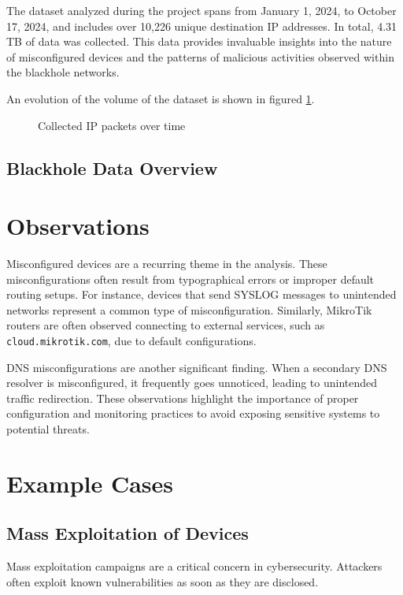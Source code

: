 The dataset analyzed during the project spans from January 1, 2024, to October 17, 2024, and includes over 10,226 unique destination IP addresses. In total, 4.31 TB of data was collected. This data provides invaluable insights into the nature of misconfigured devices and the patterns of malicious activities observed within the blackhole networks.

An evolution of the volume of the dataset is shown in figured \ref{countedpacket}. 

\begin{figure}
    
    \caption{Collected IP packets over time}
    \label{countedpacket}
\end{figure}

{\color{red} \section{Blackhole Data Overview}}

\chapter{Observations} 
Misconfigured devices are a recurring theme in the analysis. These misconfigurations often result from typographical errors or improper default routing setups. For instance, devices that send SYSLOG messages to unintended networks represent a common type of misconfiguration. Similarly, MikroTik routers are often observed connecting to external services, such as \texttt{cloud.mikrotik.com}, due to default configurations.

DNS misconfigurations are another significant finding. When a secondary DNS resolver is misconfigured, it frequently goes unnoticed, leading to unintended traffic redirection. These observations highlight the importance of proper configuration and monitoring practices to avoid exposing sensitive systems to potential threats.

\chapter{Example Cases}
\section{Mass Exploitation of Devices}
Mass exploitation campaigns are a critical concern in cybersecurity. Attackers often exploit known vulnerabilities as soon as they are disclosed.

